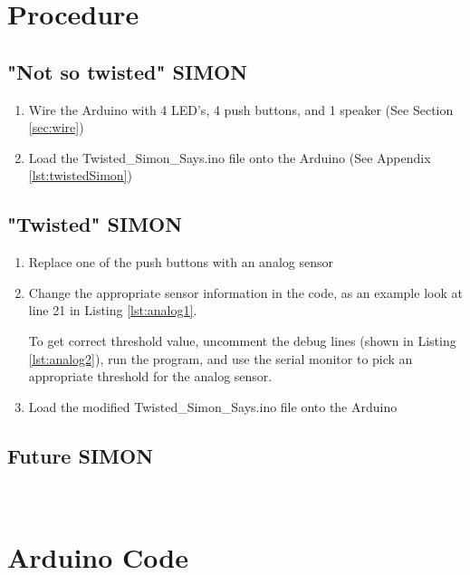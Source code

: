 \documentclass[12pt,letterpaper,oneside]{article}
\begin{document}
\section{Procedure}
		
		\subsection{"Not so twisted" SIMON}
			\begin{enumerate}
				\item Wire the Arduino with 4 LED's, 4 push buttons, and 1 speaker (See Section \ref{sec:wire})
				\item Load the Twisted\_Simon\_Says.ino file onto the Arduino (See Appendix \ref{lst:twistedSimon})
			\end{enumerate}
								
		\subsection{"Twisted" SIMON}
			\begin{enumerate}
				\item Replace one of the push buttons with an analog sensor
				\item Change the appropriate sensor information in the code, as an example look at line 21 in Listing \ref{lst:analog1}.
					\begin{center}
						\begin{minipage}{.9\textwidth}
							
						\end{minipage}
					\end{center}
					To get correct threshold value, uncomment the debug lines (shown in Listing \ref{lst:analog2}), run the program, and use the serial monitor to pick an appropriate threshold for the analog sensor. 
					\begin{center}
						\begin{minipage}{.9\textwidth}
							
						\end{minipage}
					\end{center}
				\item Load the modified Twisted\_Simon\_Says.ino file onto the Arduino
			\end{enumerate}
			\newpage
			
		\subsection{Future SIMON}
			
\appendix
\section{\\Arduino Code} \label{App:AppendixA}
	\begin{center}
			
	\end{center}	
\newpage		
\printbibliography
\end{document}
